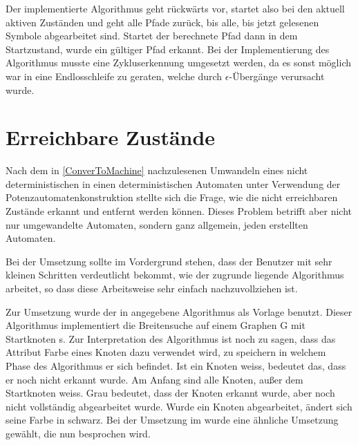Der implementierte Algorithmus geht rückwärts vor, startet also bei den aktuell
aktiven Zuständen und geht alle Pfade zurück, bis alle, bis jetzt gelesenen
Symbole abgearbeitet sind. Startet der berechnete Pfad dann in dem
Startzustand, wurde ein gültiger Pfad erkannt. Bei der Implementierung des
Algorithmus musste eine Zykluserkennung umgesetzt werden, da es sonst möglich
war in eine Endlosschleife zu geraten, welche durch $\epsilon$-Übergänge
verursacht wurde.


\section{Erreichbare Zustände}\label{ReachableStates}

Nach dem in \ref{ConverToMachine} nachzulesenen Umwandeln eines nicht
deterministischen in einen deterministischen Automaten unter Verwendung der
Potenzautomatenkonstruktion stellte sich die Frage, wie die nicht erreichbaren
Zustände erkannt und entfernt werden können. Dieses Problem betrifft aber nicht
nur umgewandelte Automaten, sondern ganz allgemein, jeden erstellten
Automaten.\vspace{10pt}

Bei der Umsetzung sollte im Vordergrund stehen, dass der Benutzer mit sehr
kleinen Schritten verdeutlicht bekommt, wie der zugrunde liegende Algorithmus
arbeitet, so dass diese Arbeitsweise sehr einfach nachzuvollziehen
ist.\vspace{10pt}

Zur Umsetzung wurde der in  angegebene Algorithmus
als Vorlage benutzt. Dieser Algorithmus implementiert die Breitensuche auf
einem Graphen G mit Startknoten s. Zur Interpretation des Algorithmus ist noch
zu sagen, dass das Attribut Farbe eines Knoten dazu verwendet wird, zu
speichern in welchem Phase des Algorithmus er sich befindet. Ist ein Knoten
weiss, bedeutet das, dass er noch nicht erkannt wurde. Am Anfang sind alle
Knoten, außer dem Startknoten weiss. Grau bedeutet, dass der Knoten erkannt
wurde, aber noch nicht vollständig abgearbeitet wurde. Wurde ein Knoten
abgearbeitet, ändert sich seine Farbe in schwarz. Bei der Umsetzung im \gtitool
wurde eine ähnliche Umsetzung gewählt, die nun besprochen wird.\vspace{10pt}

